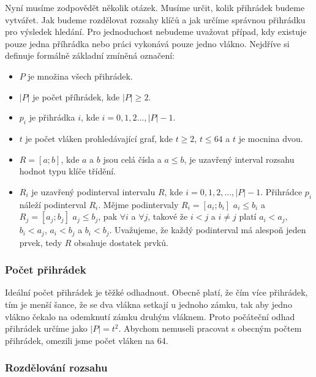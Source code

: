 Nyní musíme zodpovědět několik otázek.
Musíme určit, kolik přihrádek budeme vytvářet.
Jak budeme rozdělovat rozsahy klíčů a jak určíme správnou přihrádku pro výsledek hledání.
Pro jednoduchost nebudeme uvažovat případ, kdy existuje pouze jedna příhrádka nebo práci vykonává pouze jedno vlákno.
Nejdříve si definuje formálně základní zmíněná označení:

\begin{itemize}

\item $P$ je množina všech přihrádek.

\item $|P|$ je počet příhrádek, kde $|P|\geq2$.

\item $p_i$ je přihrádka $i$, kde $i=0, 1, 2 ..., |P|-1$.

\item $t$ je počet vláken prohledávající graf, kde $t\geq2$, $t\leq64$ a $t$ je mocnina dvou.

\item $R=[a; b]$, kde $a$ a $b$ jsou celá čísla a $a\leq b$, je uzavřený interval rozsahu hodnot typu klíče třídění.

\item $R_i$ je uzavřený podinterval intervalu $R$, kde $i=0, 1, 2, ..., |P|-1$.
Přihrádce $p_i$ náleží podinterval $R_i$.
Mějme podintervaly $R_i=[a_i; b_i]$ $a_i\leq b_i$ a $R_j=[a_j; b_j]$ $a_j\leq b_j$, pak $\forall i$ a $\forall j$, takové že $i<j$ a $i\neq j$ platí $a_i<a_j$, $b_i<a_j$, $a_i<b_j$ a $b_i<b_j$.
Uvažujeme, že každý podinterval má alespoň jeden prvek, tedy $R$ obsahuje dostatek prvků.

\end{itemize}

\subsubsection{Počet přihrádek}

Ideální počet přihrádek je těžké odhadnout.
Obecně platí, že čím více přihrádek, tím je menší šance, že se dva vlákna setkají u jednoho zámku, tak aby jedno vlákno čekalo na odemknutí zámku druhým vláknem.
Proto počáteční odhad přihrádek určíme jako $|P|=t^2$.
Abychom nemuseli pracovat s obecným počtem přihrádek, omezili jsme počet vláken na 64.

\subsubsection{Rozdělování rozsahu}

